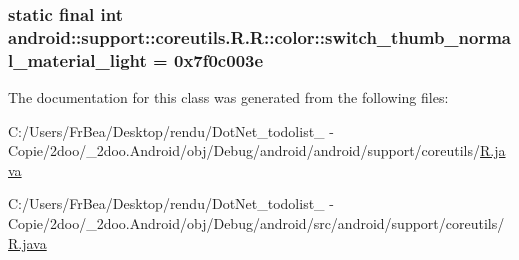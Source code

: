 \hypertarget{classandroid_1_1support_1_1coreutils_1_1_r_1_1color_8867cabbea7a1f3a9b437123d0f7c349}{
\subsubsection[{switch\_\-thumb\_\-normal\_\-material\_\-light}]{\setlength{\rightskip}{0pt plus 5cm}static final int android::support::coreutils.R.R::color::switch\_\-thumb\_\-normal\_\-material\_\-light = 0x7f0c003e}}
\label{classandroid_1_1support_1_1coreutils_1_1_r_1_1color_8867cabbea7a1f3a9b437123d0f7c349}




The documentation for this class was generated from the following files:\begin{CompactItemize}
\item 
C:/Users/FrBea/Desktop/rendu/DotNet\_\-todolist\_ - Copie/2doo/\_\-2doo.Android/obj/Debug/android/android/support/coreutils/\hyperlink{android_2support_2coreutils_2_r_8java}{R.java}\item 
C:/Users/FrBea/Desktop/rendu/DotNet\_\-todolist\_ - Copie/2doo/\_\-2doo.Android/obj/Debug/android/src/android/support/coreutils/\hyperlink{src_2android_2support_2coreutils_2_r_8java}{R.java}\end{CompactItemize}
